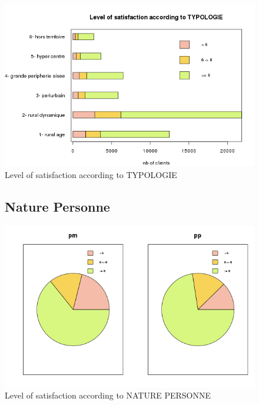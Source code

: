 \documentclass[a4paper, 11pt]{article}
\begin{document}
    \begin{figure}[!ht]
    	\centering
            \includegraphics[height = 10 cm]{Remi/Level_of_satisfaction_according_to_TYPOLOGIE.png}
            \caption{Level of satisfaction according to TYPOLOGIE}
            \label{fig:TYPOLOGIE}
    \end{figure}

    \begin{figure}[!ht]
    \subsection{Nature Personne}
    	\centering
            \includegraphics[width = 10 cm]{Remi/Level_of_satisfaction_according_to_NATURE_PERSONNE2.png}
            \caption{Level of satisfaction according to NATURE PERSONNE}
            \label{fig:NATURE_PERSONNE2}
    \end{figure}
\end{document}
